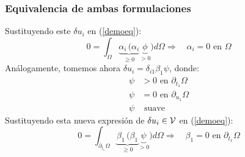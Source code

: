 \documentclass{beamer}
\begin{document}
\begin{frame}
\frametitle{Equivalencia de ambas formulaciones}
Sustituyendo este $\delta u_i$ en (\ref{demoeq}):
\begin{equation}
0=\int_{\Omega} \underbrace{\alpha_i \, (\alpha_i}_{\geq 0}
\underbrace{ \phi}_{>0}) d\Omega 
\Rightarrow \quad \alpha_i=0 \textrm{ en } \Omega
\end{equation}
Análogamente, tomemos ahora $\delta u_i=\delta_{i1} \beta_1 \psi$, donde:
\begin{align*}
\psi&>0 \textrm{ en } \partial_{t_1}\Omega \\
\psi&=0 \textrm{ en } \partial_{u_1} \Omega \\
\psi& \textrm{ suave}
\end{align*}
Sustituyendo esta nueva expresión de $\delta u_i \in {\cal V}$ en
(\ref{demoeq}):
\begin{equation}
0=\int_{\partial_{t_1} \Omega} \underbrace{\beta_1 \, (\beta_1}_{\geq 0}
\underbrace{ \psi}_{>0}) d\Omega 
\Rightarrow \quad \beta_1=0 \textrm{ en } \partial_{t_1} \Omega
\end{equation}
\end{frame}
\end{document}

